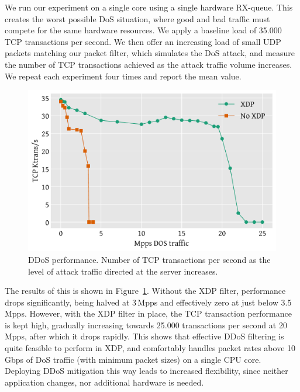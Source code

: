 \documentclass[10pt,sigconf]{acmart}
\begin{document}
We run our experiment on a single core using a single hardware RX-queue.  This
creates the worst possible DoS situation, where good and bad traffic must
compete for the same hardware resources. We apply a baseline load of 35.000 TCP
transactions per second. We then offer an increasing load of small UDP packets
matching our packet filter, which simulates the DoS attack, and measure the
number of TCP transactions achieved as the attack traffic volume increases. We
repeat each experiment four times and report the mean value.

\begin{figure}[t]
\centering
\includegraphics[width=\linewidth]{figures/ddos-test.pdf}
\caption{\label{fig:ddos-results} DDoS performance. Number of TCP transactions
  per second as the level of attack traffic directed at the server increases.}
\end{figure}

The results of this is shown in Figure~\ref{fig:ddos-results}. Without the XDP
filter, performance drops significantly, being halved at 3\,Mpps and effectively
zero at just below 3.5\,Mpps. However, with the XDP filter in place, the TCP
transaction performance is kept high, gradually increasing towards 25.000
transactions per second at 20\,Mpps, after which it drops rapidly. This shows
that effective DDoS filtering is quite feasible to perform in XDP, and
comfortably handles packet rates above 10\,Gbps of DoS traffic (with minimum
packet sizes) on a single CPU core. Deploying DDoS mitigation this way leads to
increased flexibility, since neither application changes, nor additional
hardware is needed.
\end{document}
